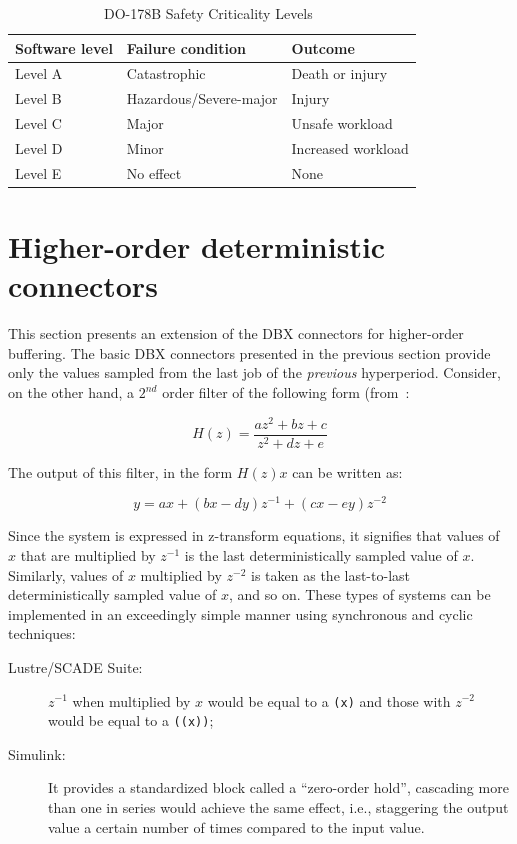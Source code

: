 \begin{table}
\centering
{\footnotesize
\begin{tabular}{|l|l|l|}
\hline
\textbf{Software level}&\textbf{Failure condition}&\textbf{Outcome}\\
\hline
Level A & Catastrophic & Death or injury\\
Level B & Hazardous/Severe-major & Injury\\
Level C & Major & Unsafe workload\\
Level D & Minor & Increased workload\\
Level E & No effect & None\\
\hline
\end{tabular}
}
\caption{DO-178B Safety Criticality Levels~\cite{gasperoni@ae02}}
\label{table:do178b_cats}
\end{table}

\section{Higher-order deterministic connectors}
This section presents an extension of the DBX connectors for
higher-order buffering. The basic DBX connectors presented in the
previous section provide only the values sampled from the last job of
the \emph{previous} hyperperiod. Consider, on the other hand, a
$2^{nd}$ order filter of the following form
(from~\cite{halbwachs@ieee91}:

\begin{displaymath}
H(z) = \frac{az^2 + bz + c}{z^2 + dz + e}
\end{displaymath}

The output of this filter, in the form $H(z)x$ can be written as:

\begin{displaymath}
y = ax + (bx-dy)z^{-1} + (cx-ey)z^{-2}
\end{displaymath}

Since the system is expressed in z-transform equations, it signifies
that values of $x$ that are multiplied by $z^{-1}$ is the last
deterministically sampled value of $x$. Similarly, values of $x$
multiplied by $z^{-2}$ is taken as the last-to-last deterministically
sampled value of $x$, and so on. These types of systems can be
implemented in an exceedingly simple manner using synchronous and
cyclic techniques:

\begin{description}
\item[Lustre/SCADE Suite:]{$z^{-1}$ when multiplied by $x$ would be
  equal to a \texttt{(x)} and those with $z^{-2}$ would be
  equal to a \texttt{(}\texttt{(x))};}
\item[Simulink:]{It provides a standardized block called a
  ``zero-order hold'', cascading more than one in series would achieve
  the same effect, i.e., staggering the output value a certain number
  of times compared to the input value.}
\end{description}


